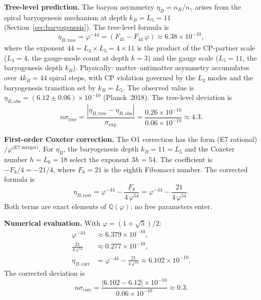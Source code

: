 \documentclass[12pt,a4paper]{article}
\begin{document}
\textbf{Tree-level prediction.} The baryon asymmetry $\eta_B = n_B/n_\gamma$ arises from the spiral baryogenesis mechanism at depth $k_B = L_5 = 11$ (Section~\ref{sec:baryogenesis}). The tree-level formula is
\begin{equation}
\eta_{B,\mathrm{tree}} = \varphi^{-44} = (F_{45} - F_{44}\,\varphi) \approx 6.38 \times 10^{-10},
\end{equation}
where the exponent $44 = L_3 \times L_5 = 4 \times 11$ is the product of the CP-partner scale ($L_3 = 4$, the gauge-mode count at depth $k = 3$) and the gauge scale ($L_5 = 11$, the baryogenesis depth $k_B$). Physically: matter--antimatter asymmetry accumulates over $4k_B = 44$ spiral steps, with CP violation governed by the $L_3$ modes and the baryogenesis transition set by $k_B = L_5$. The observed value is $\eta_{B,\mathrm{obs}} = (6.12 \pm 0.06) \times 10^{-10}$ (Planck~2018). The tree-level deviation is
\begin{equation}
n\sigma_{\mathrm{tree}} = \frac{|\eta_{B,\mathrm{tree}} - \eta_{B,\mathrm{obs}}|}{\sigma_{\mathrm{exp}}} = \frac{0.26 \times 10^{-10}}{0.06 \times 10^{-10}} \approx 4.3.
\end{equation}

\textbf{First-order Coxeter correction.} The O1 correction has the form (E7 rational)$/\varphi^{\text{(E7 integer)}}$. For $\eta_B$, the baryogenesis depth $k_B = 11 = L_5$ and the Coxeter number $h = L_6 = 18$ select the exponent $3h = 54$. The coefficient is $-F_8/4 = -21/4$, where $F_8 = 21$ is the eighth Fibonacci number. The corrected formula is
\begin{equation}
\eta_{B,\mathrm{corr}} = \varphi^{-44} - \frac{F_8}{4\,\varphi^{54}} = \varphi^{-44} - \frac{21}{4\,\varphi^{54}}.
\end{equation}
Both terms are exact elements of $\mathbb{Q}(\varphi)$; no free parameters enter.

\textbf{Numerical evaluation.} With $\varphi = (1+\sqrt{5})/2$:
\begin{align}
\varphi^{-44} &\approx 6.379 \times 10^{-10}, \\
\frac{21}{4\,\varphi^{54}} &\approx 0.277 \times 10^{-10}, \\
\eta_{B,\mathrm{corr}} &= \varphi^{-44} - \frac{21}{4\,\varphi^{54}} \approx 6.102 \times 10^{-10}.
\end{align}
The corrected deviation is
\begin{equation}
n\sigma_{\mathrm{corr}} = \frac{|6.102 - 6.12| \times 10^{-10}}{0.06 \times 10^{-10}} \approx 0.3.
\end{equation}
\end{document}

